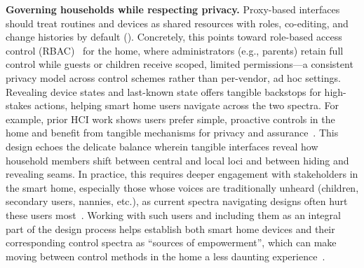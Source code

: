 \noindent\textbf{Governing households while respecting privacy.}
Proxy-based interfaces should treat routines and devices as shared resources with roles, co-editing, and change histories by default (). Concretely, this points toward role-based access control (RBAC)~\cite{rbac} for the home, where administrators (e.g., parents) retain full control while guests or children receive scoped, limited permissions---a consistent privacy model across control schemes rather than per-vendor, ad hoc settings. Revealing device states and last-known state offers tangible backstops for high-stakes actions, helping smart home users navigate across the two spectra. For example, prior HCI work shows users prefer simple, proactive controls in the home and benefit from tangible mechanisms for privacy and assurance~\cite{windl2025privacyhub,abdi2021privacy, de2015homerules}. This design echoes the delicate balance wherein tangible interfaces reveal how household members shift between central and local loci and between hiding and revealing seams. In practice, this requires deeper engagement with stakeholders in the smart home, especially those whose voices are traditionally unheard (children, secondary users, nannies, etc.), as current spectra navigating designs often hurt these users most~\cite{10.1145/3544548.3581504, 10.1145/3613904.3641962}. Working with such users and including them as an integral part of the design process helps establish both smart home devices and their corresponding control spectra as ``sources of empowerment'', which can make moving between control methods in the home a less daunting experience~\cite{10.1145/3613904.3642866}.


